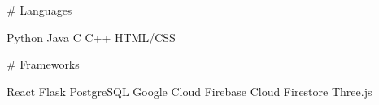 # Languages

Python
Java
C
C++
HTML/CSS


# Frameworks

React
Flask
PostgreSQL
Google Cloud
Firebase
Cloud Firestore
Three.js


